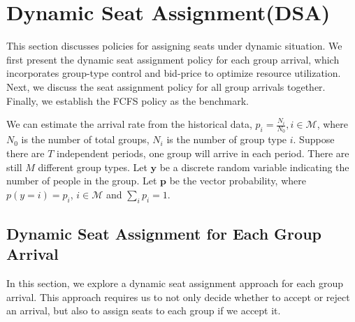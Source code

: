 
\section{Dynamic Seat Assignment(DSA)}
This section discusses policies for assigning seats under dynamic situation. We first present the dynamic seat assignment policy for each group arrival, which incorporates group-type control and bid-price to optimize resource utilization. Next, we discuss the seat assignment policy for all group arrivals together. Finally, we establish the FCFS policy as the benchmark.


We can estimate the arrival rate from the historical data, $p_i = \frac{N_{i}}{N_{0}}, i \in \mathcal{M}$, where $N_{0}$ is the number of total groups, $N_{i}$ is the number of group type $i$. Suppose there are $T$ independent periods, one group will arrive in each period. There are still $M$ different group types. Let $\mathbf{y}$ be a discrete random variable indicating the number of people in the group. Let $\mathbf{p}$ be the vector probability, where $p(y = i) = p_i$, $i \in \mathcal{M}$ and $\sum_{i} p_{i} =1$.






\subsection{Dynamic Seat Assignment for Each Group Arrival}
In this section, we explore a dynamic seat assignment approach for each group arrival. This approach requires us to not only decide whether to accept or reject an arrival, but also to assign seats to each group if we accept it.

